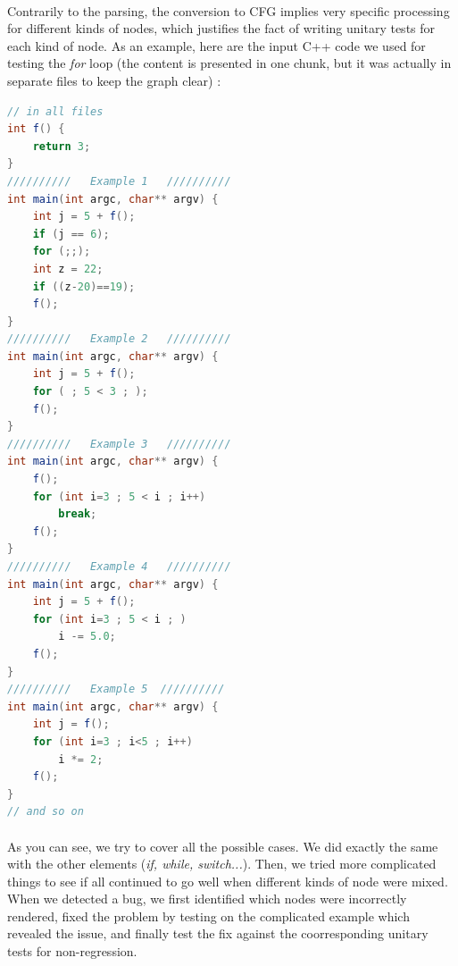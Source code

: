\documentclass{report}
\begin{document}
\paragraph{}
\hspace{4mm}\textnormal{Contrarily to the parsing, the conversion to CFG implies very specific processing for different kinds of nodes,
which justifies the fact of writing unitary tests for each kind of node. As an example, here are the input C++ code we used for testing the \textit{for} loop 
(the content is presented in one chunk, but it was actually in separate files to keep the graph clear) :}

\begin{lstlisting}[language=java]
// in all files 
int f() {
    return 3;
}
//////////   Example 1   //////////
int main(int argc, char** argv) {
    int j = 5 + f();
    if (j == 6);
    for (;;);
    int z = 22;
    if ((z-20)==19);
    f();
}
//////////   Example 2   //////////
int main(int argc, char** argv) {
    int j = 5 + f();
    for ( ; 5 < 3 ; );
    f();
}
//////////   Example 3   //////////
int main(int argc, char** argv) {
    f();
    for (int i=3 ; 5 < i ; i++)
        break;
    f();
}
//////////   Example 4   //////////
int main(int argc, char** argv) {
    int j = 5 + f();
    for (int i=3 ; 5 < i ; )
        i -= 5.0;
    f();
}
//////////   Example 5  //////////
int main(int argc, char** argv) {
    int j = f();
    for (int i=3 ; i<5 ; i++)
        i *= 2;
    f();
}
// and so on
\end{lstlisting}
\paragraph{}
\hspace{4mm}\textnormal{As you can see, we try to cover all the possible cases. We did exactly the same with the other elements (\textit{if, while, switch...}).
Then, we tried more complicated things to see if all continued to go well when different kinds of node were mixed. When we detected a bug,
we first identified which nodes were incorrectly rendered, fixed the problem by testing on the complicated example which revealed the issue, and finally
test the fix against the coorresponding unitary tests for non-regression.}
\end{document}

